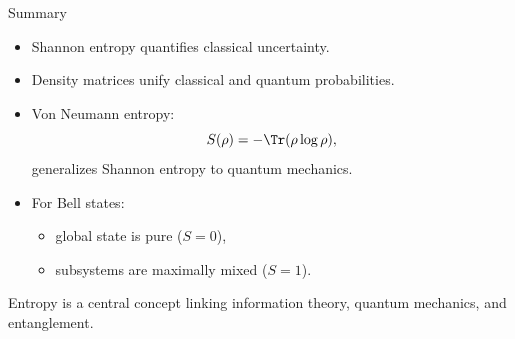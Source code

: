 \documentclass[aspectratio=169]{beamer}
\begin{document}
\begin{frame}{Summary}
\begin{itemize}
\item Shannon entropy quantifies classical uncertainty.
\item Density matrices unify classical and quantum probabilities.
\item Von Neumann entropy:
\[
S(\rho)=-\Tr(\rho\log\rho),
\]
generalizes Shannon entropy to quantum mechanics.
\item For Bell states:
  \begin{itemize}
  \item global state is pure ($S=0$),
  \item subsystems are maximally mixed ($S=1$).
  \end{itemize}
\end{itemize}

\medskip
Entropy is a central concept linking information theory,
quantum mechanics, and entanglement.
\end{frame}
\end{document}
